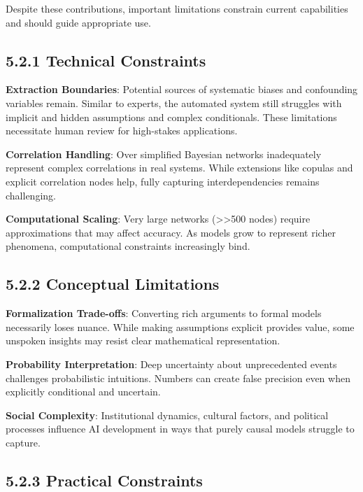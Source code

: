 \documentclass[
  11pt,
  letterpaper,
]{book}
\begin{document}
Despite these contributions, important limitations constrain current
capabilities and should guide appropriate use.

\subsection*{5.2.1 Technical
Constraints}\label{sec-technical-constraints}

\textbf{Extraction Boundaries}: Potential sources of systematic biases
and confounding variables remain. Similar to experts, the automated
system still struggles with implicit and hidden assumptions and complex
conditionals. These limitations necessitate human review for high-stakes
applications.

\textbf{Correlation Handling}: Over simplified Bayesian networks
inadequately represent complex correlations in real systems. While
extensions like copulas and explicit correlation nodes help, fully
capturing interdependencies remains challenging.

\textbf{Computational Scaling}: Very large networks
(\textgreater\textgreater500 nodes) require approximations that may
affect accuracy. As models grow to represent richer phenomena,
computational constraints increasingly bind.

\subsection*{5.2.2 Conceptual
Limitations}\label{sec-conceptual-limitations}

\textbf{Formalization Trade-offs}: Converting rich arguments to formal
models necessarily loses nuance. While making assumptions explicit
provides value, some unspoken insights may resist clear mathematical
representation.

\textbf{Probability Interpretation}: Deep uncertainty about
unprecedented events challenges probabilistic intuitions. Numbers can
create false precision even when explicitly conditional and uncertain.

\textbf{Social Complexity}: Institutional dynamics, cultural factors,
and political processes influence AI development in ways that purely
causal models struggle to capture.

\subsection*{5.2.3 Practical
Constraints}\label{sec-practical-constraints}
\end{document}
